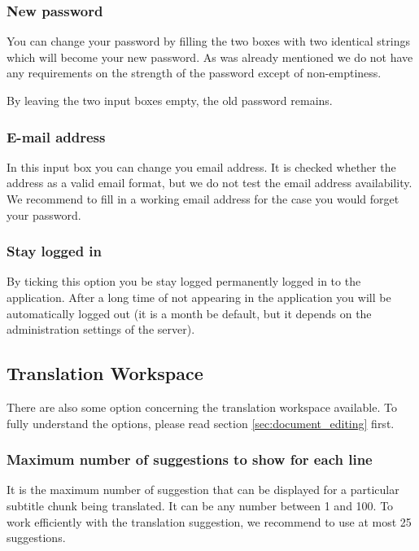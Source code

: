 \subsubsection{New password}

You can change your password by filling the two boxes with two identical strings which will become your new password. As was already mentioned we do not have any requirements on the strength of the password except of non-emptiness. 

By leaving the two input boxes empty, the old password remains.

\subsubsection{E-mail address}

In this input box you can change you email address. It is checked whether the address as a valid email format, but we do not test the email address availability. We recommend to fill in a working email address for the case you would forget your password.

\subsubsection{Stay logged in}

By ticking this option you be stay logged permanently logged in to the application. After a long time of not appearing in the application you will be automatically logged out (it is a month be default, but it depends on the administration settings of the server).

\subsection{Translation Workspace}

There are also some option concerning the translation workspace available. To fully understand the options, please read section \ref{sec:document_editing} first.

\subsubsection{Maximum number of suggestions to show for each line}

It is the maximum number of suggestion that can be displayed for a particular subtitle chunk being translated. It can be any number between 1 and 100. To work efficiently with the translation suggestion, we recommend to use at most 25 suggestions.

